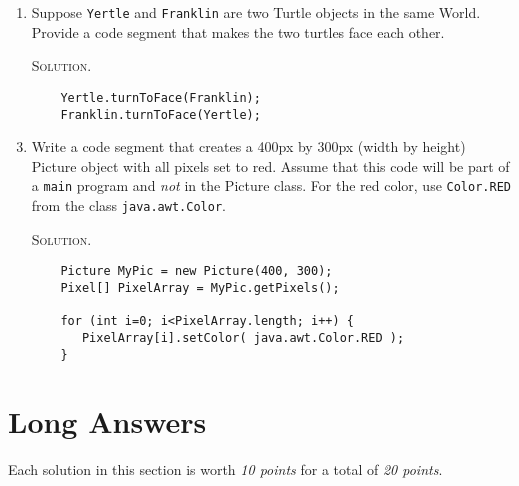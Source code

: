 \documentclass[12pt]{report}
\begin{document}
\begin{enumerate}
\vspace{1.5cm}
\item Suppose \texttt{Yertle} and \texttt{Franklin} are two Turtle objects in the same World. Provide a code segment that makes the two turtles face each other.
\vspace{.5cm}
\item[\textsc{Solution.}]
\begin{verbatim}
    Yertle.turnToFace(Franklin);
    Franklin.turnToFace(Yertle);
\end{verbatim}

\vspace{1.5cm}
\item Write a code segment that creates a 400px by 300px (width by height) Picture object with all pixels set to red. Assume that this code will be part of a
{\tt main} program and \emph{not} in the Picture class.
For the red color, use {\tt Color.RED} from the class {\tt java.awt.Color}.
\vspace{.5cm}
\item[\textsc{Solution.}]
\begin{verbatim}
    Picture MyPic = new Picture(400, 300);
    Pixel[] PixelArray = MyPic.getPixels();
        
    for (int i=0; i<PixelArray.length; i++) {
       PixelArray[i].setColor( java.awt.Color.RED ); 
    }
\end{verbatim}


\end{enumerate}

\clearpage
\section*{Long Answers}
Each solution in this section is worth \emph{10 points} for a total of \emph{20 points}.
\end{document}
